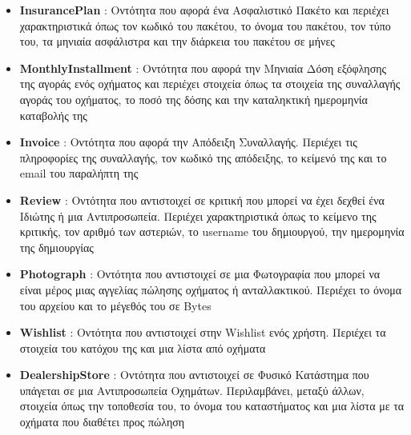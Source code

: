 \documentclass{../ol-softwaremanual}
\begin{document}
\begin{itemize}
		\item \en \textbf{InsurancePlan} \gr : Οντότητα που αφορά ένα Ασφαλιστικό Πακέτο και περιέχει χαρακτηριστικά όπως τον κωδικό του πακέτου, το όνομα του πακέτου, τον τύπο του, τα μηνιαία ασφάλιστρα και την διάρκεια του πακέτου σε μήνες
		\item \en \textbf{MonthlyInstallment} \gr : Οντότητα που αφορά την Μηνιαία Δόση εξόφλησης της αγοράς ενός οχήματος και περιέχει στοιχεία όπως τα στοιχεία της συναλλαγής αγοράς του οχήματος, το ποσό της δόσης και την καταληκτική ημερομηνία καταβολής της
		\item \en \textbf{Invoice} \gr : Οντότητα που αφορά την Απόδειξη Συναλλαγής. Περιέχει τις πληροφορίες της συναλλαγής, τον κωδικό της απόδειξης, το κείμενό της και το \en email \gr του παραλήπτη της	
		\item \en \textbf{Review} \gr : Οντότητα που αντιστοιχεί σε κριτική που μπορεί να έχει δεχθεί ένα Ιδιώτης ή μια Αντιπροσωπεία. Περιέχει χαρακτηριστικά όπως το κείμενο της κριτικής, τον αριθμό των αστεριών, το \en username \gr του δημιουργού, την ημερομηνία της δημιουργίας
		\item \en \textbf{Photograph} \gr : Οντότητα που αντιστοιχεί σε μια Φωτογραφία που μπορεί να είναι μέρος μιας αγγελίας πώλησης οχήματος ή ανταλλακτικού. Περιέχει το όνομα του αρχείου και το μέγεθός του σε \en Bytes \gr
		\item \en \textbf{Wishlist} \gr : Οντότητα που αντιστοιχεί στην \en Wishlist \gr ενός χρήστη. Περιέχει τα στοιχεία του κατόχου της και μια λίστα από οχήματα
		\item \en \textbf{DealershipStore} \gr : Οντότητα που αντιστοιχεί σε Φυσικό Κατάστημα που υπάγεται σε μια Αντιπροσωπεία Οχημάτων. Περιλαμβάνει, μεταξύ άλλων, στοιχεία όπως την τοποθεσία του, το όνομα του καταστήματος και μια λίστα με τα οχήματα που διαθέτει προς πώληση
	\end{itemize}
	
	
	
	
	
\end{document}
